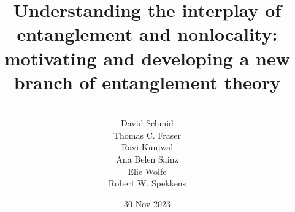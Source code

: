 \documentclass[12pt]{article}
\theoremstyle{plain}
\theoremstyle{definition}
\begin{document}
\title{Understanding the interplay of entanglement and nonlocality: %
motivating and developing a new branch of entanglement theory}

\author{{~~} \\David Schmid \\ Thomas C. Fraser \\ Ravi Kunjwal \\ Ana Belen Sainz \\ Elie Wolfe \\ Robert W. Spekkens}

\date{30 Nov 2023}
\maketitle
\newpage
\end{document}
